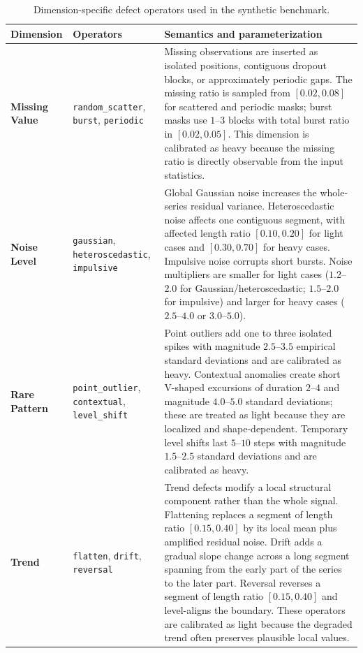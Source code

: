 \documentclass{article}
\begin{document}
\begin{table}[!htbp]
\centering
\caption{Dimension-specific defect operators used in the synthetic benchmark.}
\small
\setlength{\tabcolsep}{4pt}
\renewcommand{\arraystretch}{1.18}
\begin{tabular}{>{\raggedright\arraybackslash}p{2.05cm}
                >{\raggedright\arraybackslash}p{3.25cm}
                >{\raggedright\arraybackslash}p{7.35cm}}
\toprule
\textbf{Dimension} & \textbf{Operators} & \textbf{Semantics and parameterization} \\
\midrule
\textbf{Missing Value}
& \texttt{random\_scatter}, \texttt{burst}, \texttt{periodic}
& Missing observations are inserted as isolated positions, contiguous dropout blocks, or approximately periodic gaps. The missing ratio is sampled from $[0.02,0.08]$ for scattered and periodic masks; burst masks use $1$--$3$ blocks with total burst ratio in $[0.02,0.05]$. This dimension is calibrated as heavy because the missing ratio is directly observable from the input statistics. \\
\textbf{Noise Level}
& \texttt{gaussian}, \texttt{heteroscedastic}, \texttt{impulsive}
& Global Gaussian noise increases the whole-series residual variance. Heteroscedastic noise affects one contiguous segment, with affected length ratio $[0.10,0.20]$ for light cases and $[0.30,0.70]$ for heavy cases. Impulsive noise corrupts short bursts. Noise multipliers are smaller for light cases ($1.2$--$2.0$ for Gaussian/heteroscedastic; $1.5$--$2.0$ for impulsive) and larger for heavy cases ($2.5$--$4.0$ or $3.0$--$5.0$). \\
\textbf{Rare Pattern}
& \texttt{point\_outlier}, \texttt{contextual}, \texttt{level\_shift}
& Point outliers add one to three isolated spikes with magnitude $2.5$--$3.5$ empirical standard deviations and are calibrated as heavy. Contextual anomalies create short V-shaped excursions of duration $2$--$4$ and magnitude $4.0$--$5.0$ standard deviations; these are treated as light because they are localized and shape-dependent. Temporary level shifts last $5$--$10$ steps with magnitude $1.5$--$2.5$ standard deviations and are calibrated as heavy. \\
\textbf{Trend}
& \texttt{flatten}, \texttt{drift}, \texttt{reversal}
& Trend defects modify a local structural component rather than the whole signal. Flattening replaces a segment of length ratio $[0.15,0.40]$ by its local mean plus amplified residual noise. Drift adds a gradual slope change across a long segment spanning from the early part of the series to the later part. Reversal reverses a segment of length ratio $[0.15,0.40]$ and level-aligns the boundary. These operators are calibrated as light because the degraded trend often preserves plausible local values. \\

\end{tabular}
\end{table}
\end{document}
